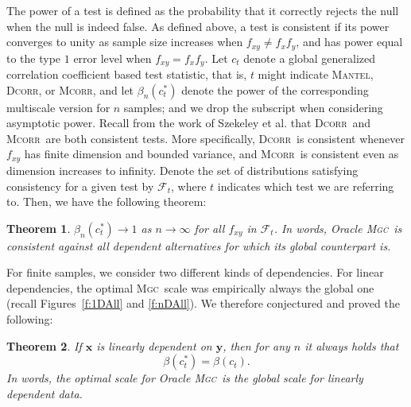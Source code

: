 \documentclass[11pt]{article}
\providecommand{\sct}[1]{{\normalfont\textsc{#1}}}
\providecommand{\mb}[1]{\boldsymbol{#1}}
\providecommand{\mc}[1]{\mathcal{#1}}
\newcommand{\G}{c}
\newcommand{\Mgc}{\sct{Mgc}}
\newcommand{\Dcorr}{\sct{Dcorr}}
\newcommand{\Mcorr}{\sct{Mcorr}}
\newcommand{\Mantel}{\sct{Mantel}}
\newtheorem{thm}{Theorem}
\begin{document}
The power of a test is defined as the probability that it correctly rejects the null when the null is indeed false.
As defined above, a test is consistent if its power converges to unity as sample size increases when $f_{xy} \neq f_x f_y$, and has power equal to the type $1$ error level when $f_{xy}=f_x f_y$.
Let $\G_t$ denote a global generalized correlation coefficient based test statistic, that is, $t$ might indicate \Mantel, \Dcorr, or \Mcorr, and let $\beta_n(\G_t^*)$ denote the power of the corresponding multiscale version for $n$ samples; and we drop the subscript when considering asymptotic power.
Recall from the work of Szekeley et al. that \Dcorr~and \Mcorr~are both consistent tests. More specifically, \Dcorr~is consistent whenever $f_{xy}$ has finite dimension and bounded variance, and \Mcorr~is consistent even as dimension increases to infinity.  Denote the set of distributions satisfying consistency for a given test by $\mc{F}_t$, where $t$ indicates which test we are referring to. Then, we have the following theorem:
\begin{thm}
\label{thm1}
$\beta_n(\G_t^*) \rightarrow 1$ as $n \to \infty$ for all $f_{xy}$ in $\mc{F}_t$.
In words, Oracle \Mgc~is consistent against all dependent alternatives for which its global counterpart is. 
\end{thm}

% 
For finite samples, we consider two different kinds of dependencies.
For linear dependencies,  the optimal \Mgc~scale was empirically always the global one (recall Figures~\ref{f:1DAll} and \ref{f:nDAll}). We therefore conjectured and proved the following:
\begin{thm}
\label{t:linear}
If $\mb{x}$ is linearly dependent on $\mb{y}$, then for any $n$ it always holds that
\begin{equation}
\beta(\G^{*}_t) = \beta(\G_t).
\end{equation}
In words, the optimal scale for Oracle \Mgc~is the global scale for linearly dependent data.
\end{thm}
\end{document}
